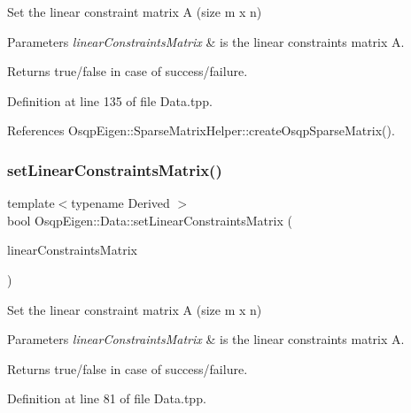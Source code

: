 Set the linear constraint matrix A (size m x n) 


\begin{DoxyParams}{Parameters}
{\em linear\+Constraints\+Matrix} & is the linear constraints matrix A. \\
\hline
\end{DoxyParams}
\begin{DoxyReturn}{Returns}
true/false in case of success/failure. 
\end{DoxyReturn}


Definition at line 135 of file Data.\+tpp.



References Osqp\+Eigen\+::\+Sparse\+Matrix\+Helper\+::create\+Osqp\+Sparse\+Matrix().

\mbox{\label{classOsqpEigen_1_1Data_a417bc1b26a3ed55015f7516e8c393e53}} 
\subsubsection{\texorpdfstring{set\+Linear\+Constraints\+Matrix()}{setLinearConstraintsMatrix()}\hspace{0.1cm}{\footnotesize\ttfamily [2/2]}}
{\footnotesize\ttfamily template$<$typename Derived $>$ \\
bool Osqp\+Eigen\+::\+Data\+::set\+Linear\+Constraints\+Matrix (\begin{DoxyParamCaption}\item[{const Eigen\+::\+Sparse\+Compressed\+Base$<$ Derived $>$ \&}]{linear\+Constraints\+Matrix }\end{DoxyParamCaption})}



Set the linear constraint matrix A (size m x n) 


\begin{DoxyParams}{Parameters}
{\em linear\+Constraints\+Matrix} & is the linear constraints matrix A. \\
\hline
\end{DoxyParams}
\begin{DoxyReturn}{Returns}
true/false in case of success/failure. 
\end{DoxyReturn}


Definition at line 81 of file Data.\+tpp.



